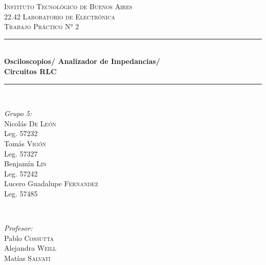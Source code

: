 \begin{titlepage}
    
\newcommand{\HRule}{\rule{\linewidth}{0.5mm}} %
    
\center %
     
    
\textsc{\LARGE Instituto Tecnológico de Buenos Aires}\\[2cm] %
\textsc{\Large 22.42 Laboratorio de Electrónica}\\[1.5cm] %
\textsc{\large Trabajo Práctico N° 2}\\[0.5cm] %
    
    
\HRule \\[0.5cm]
{ \huge \bfseries Osciloscopios/ Analizador de Impedancias/ \\Circuitos RLC}\\[0.4cm] %
\HRule \\[2cm]
     
    
\begin{minipage}{0.4\textwidth}
\begin{flushleft} \large
\emph{Grupo 5:}\\		%
[.3cm]
Nicolás \textsc{De León}\\
Leg. 57232\\ 
[.3cm]
Tomás \textsc{Vigón}\\
Leg. 57327\\ 
[.3cm]
Benjamín \textsc{Lin}\\
Leg. 57242 \\ 
[.3cm]
Lucero Guadalupe \textsc{Fernandez}\\
Leg. 57485\\ 
[.3cm]
\end{flushleft}
\end{minipage}
~
\begin{minipage}{0.4\textwidth}
\begin{flushright} \large
\emph{Profesor:} \\
[.3cm]
Pablo  \textsc{Cossutta}\\ %
Alejandra \textsc{Weill} \\%
Matías  \textsc{Salvati} %
\end{flushright}
\end{minipage}\\[2cm]
    

\end{titlepage}
